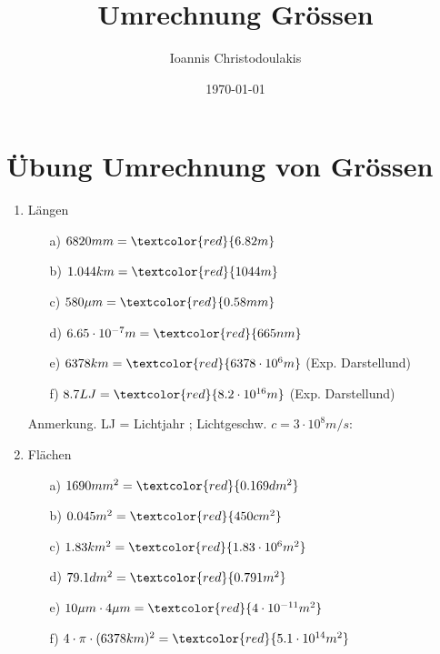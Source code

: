 \documentclass[11pt, a4paper, twoside, fleqn]{article}
\title{Umrechnung Grössen}
\author{Ioannis Christodoulakis}
\date{\today}
\begin{document}
\maketitle
\newpage
\newpage
\section{Übung Umrechnung von Grössen}
\begin{enumerate}[itemsep=1ex, leftmargin=*]
\item Längen
    \begin{enumerate}[itemsep=2mm]
        \item[a)] $ 6820 mm = \textcolor{red}{6.82 m} $
        \item[b)] $ 1.044 km = \textcolor{red}{1044 m} $
        \item[c)] $ 580 \mu m = \textcolor{red}{0.58 mm} $
        \item[d)] $ 6.65 \cdot 10^{-7} m = \textcolor{red}{665 nm} $
        \item[e)] $ 6378 km = \textcolor{red}{6378 \cdot 10^{6} m } $ (Exp. Darstellund)
        \item[f)] $ 8.7 LJ = \textcolor{red}{8.2 \cdot 10^{16} m} $ (Exp. Darstellund)
    \end{enumerate}
    Anmerkung. LJ = Lichtjahr ; Lichtgeschw. $ c = 3\cdot 10^{8} m/s : $
\item Flächen
    \begin{enumerate}[itemsep=2mm]
        \item[a)] $ 1690 mm^{2} = \textcolor{red}{0.169 dm^{2}} $
        \item[b)] $ 0.045 m^{2} = \textcolor{red}{450 cm^{2}} $
        \item[c)] $ 1.83 km^{2} = \textcolor{red}{1.83 \cdot 10^{6} m^{2}} $
        \item[d)] $ 79.1 dm^{2} = \textcolor{red}{0.791 m^{2}} $
        \item[e)] $ 10 \mu m \cdot 4 \mu m = \textcolor{red}{4 \cdot 10^{-11} m^{2}} $ 
        \item[f)] $ 4 \cdot \pi \cdot (6378 km)^{2} = \textcolor{red}{5.1 \cdot 10^{14} m^{2}} $

\end{enumerate}
\end{enumerate}
\end{document}
